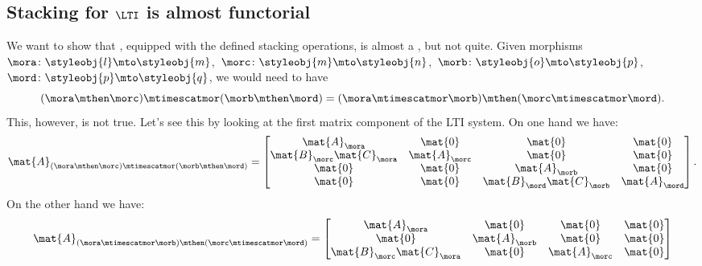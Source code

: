 \subsection{Stacking for $\LTI$ is almost functorial}

\begin{example}
    We want to show that \LTI, equipped with the defined stacking operations, is almost a , but not quite.
    Given morphisms~$\mora\colon \styleobj{l}\mto \styleobj{m}$,~$\morc\colon \styleobj{m}\mto \styleobj{n}$,~$\morb\colon \styleobj{o}\mto \styleobj{p}$,~$\mord\colon \styleobj{p}\mto \styleobj{q}$, we would need to have
    \begin{equation*}
        (\mora \mthen \morc)
        \mtimescatmor (\morb\mthen \mord)=(\mora\mtimescatmor \morb)\mthen (\morc\mtimescatmor \mord).
    \end{equation*}
    This, however, is not true.
    Let's see this by looking at the first matrix component of the LTI system.
    On one hand we have:
    \begin{equation}\label{eq:checking-LTI-functorial-stacking-1}
        \mat{A}_{(\mora \mthen \morc)\mtimescatmor (\morb\mthen \mord)}=
        \begin{bmatrix}
            \mat{A}_\mora              & \mat{0}       & \mat{0}                    & \mat{0}       \\
            \mat{B}_\morc\mat{C}_\mora & \mat{A}_\morc & \mat{0}                    & \mat{0}       \\
            \mat{0}                    & \mat{0}       & \mat{A}_\morb              & \mat{0}       \\
            \mat{0}                    & \mat{0}       & \mat{B}_\mord\mat{C}_\morb & \mat{A}_\mord
        \end{bmatrix}.
    \end{equation}
    On the other hand we have:
    \begin{equation}\label{eq:checking-LTI-functorial-stacking-2}
        \mat{A}_{(\mora\mtimescatmor \morb)\mthen (\morc\mtimescatmor \mord)}=
        \begin{bmatrix}
            \mat{A}_\mora               & \mat{0}                     & \mat{0}       & \mat{0}       \\
            \mat{0}                     & \mat{A}_\morb               & \mat{0}       & \mat{0}       \\
            \mat{B}_\morc \mat{C}_\mora & \mat{0}                     & \mat{A}_\morc & \mat{0}       \\

\end{bmatrix}
\end{equation}
\end{example}
